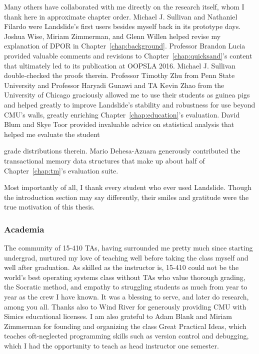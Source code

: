 \documentclass[12pt]{cmuthesis}
\begin{document}
\begin{acknowledgments}
{Many others have collaborated with me directly on the research itself,
whom I thank here in approximate chapter order.
Michael J. Sullivan and Nathaniel Filardo were Landslide's first users besides myself back in its prototype days.
Joshua Wise, Miriam Zimmerman, and Glenn Willen helped revise my explanation of DPOR in Chapter~\ref{chap:background}.
Professor Brandon Lucia provided valuable comments and revisions to Chapter~\ref{chap:quicksand}'s content
that ultimately led to its publication at OOPSLA 2016.
Michael J. Sullivan double-checked the proofs therein.
Professor Timothy Zhu from Penn State University
and Professor Haryadi Gunawi and TA Kevin Zhao from the University of Chicago
graciously allowed me to use their students as guinea pigs
and helped greatly to improve Landslide's stability and robustness for use beyond CMU's walls,
greatly enriching Chapter~\ref{chap:education}'s evaluation.
David Blum and Skye Toor provided
invaluable advice on statistical analysis
that helped me evaluate the student
\unskip\parfillskip 0pt \par}

\pagebreak

\noindent
grade distributions therein.
Mario Dehesa-Azuara generously contributed the
transactional memory data structures
that make up about half of Chapter~\ref{chap:tm}'s evaluation suite.

Most importantly of all, I thank every student who ever used Landslide.
Though the introduction section may say differently,
their smiles and gratitude were the true motivation of this thesis.

\subsubsection{Academia}

The community of 15-410 TAs,
having surrounded me pretty much since starting undergrad,
nurtured my love of teaching
well before taking the class myself and well after graduation.
As skilled as the instructor is,
15-410 could not be the world's best operating systems class
without TAs who value thorough grading, the Socratic method,
and empathy to struggling students as much
from year to year as the crew I have known.
It was a blessing to serve, and later do research, among you all.
Thanks also to Wind River for generously providing CMU with Simics educational licenses.
I am also grateful to Adam Blank and Miriam Zimmerman
for founding and organizing the class Great Practical Ideas,
which teaches oft-neglected programming skills such as version control and debugging,
which I had the opportunity to teach as head instructor one semester.


\end{acknowledgments}
\end{document}
